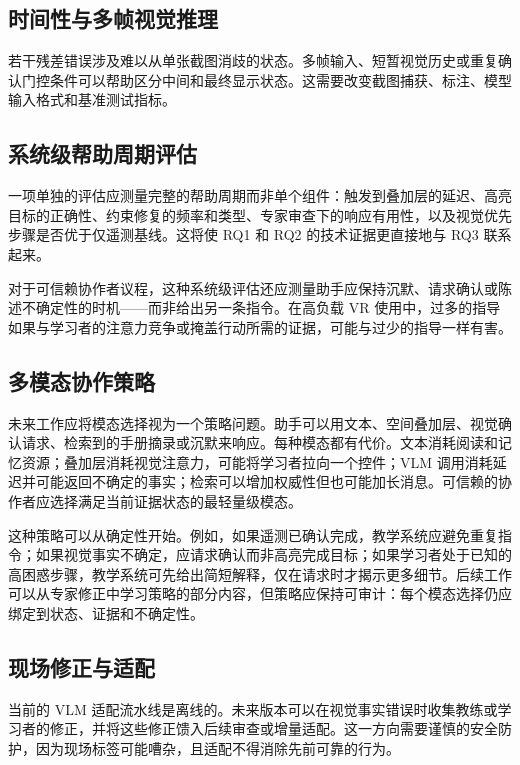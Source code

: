 \subsection{时间性与多帧视觉推理}

若干残差错误涉及难以从单张截图消歧的状态。多帧输入、短暂视觉历史或重复确认门控条件可以帮助区分中间和最终显示状态。这需要改变截图捕获、标注、模型输入格式和基准测试指标。

\subsection{系统级帮助周期评估}

一项单独的评估应测量完整的帮助周期而非单个组件：触发到叠加层的延迟、高亮目标的正确性、约束修复的频率和类型、专家审查下的响应有用性，以及视觉优先步骤是否优于仅遥测基线。这将使 RQ1 和 RQ2 的技术证据更直接地与 RQ3 联系起来。

对于可信赖协作者议程，这种系统级评估还应测量助手应保持沉默、请求确认或陈述不确定性的时机——而非给出另一条指令。在高负载 VR 使用中，过多的指导如果与学习者的注意力竞争或掩盖行动所需的证据，可能与过少的指导一样有害。

\subsection{多模态协作策略}

未来工作应将模态选择视为一个策略问题。助手可以用文本、空间叠加层、视觉确认请求、检索到的手册摘录或沉默来响应。每种模态都有代价。文本消耗阅读和记忆资源；叠加层消耗视觉注意力，可能将学习者拉向一个控件；VLM 调用消耗延迟并可能返回不确定的事实；检索可以增加权威性但也可能加长消息。可信赖的协作者应选择满足当前证据状态的最轻量级模态。

这种策略可以从确定性开始。例如，如果遥测已确认完成，教学系统应避免重复指令；如果视觉事实不确定，应请求确认而非高亮完成目标；如果学习者处于已知的高困惑步骤，教学系统可先给出简短解释，仅在请求时才揭示更多细节。后续工作可以从专家修正中学习策略的部分内容，但策略应保持可审计：每个模态选择仍应绑定到状态、证据和不确定性。

\subsection{现场修正与适配}

当前的 VLM 适配流水线是离线的。未来版本可以在视觉事实错误时收集教练或学习者的修正，并将这些修正馈入后续审查或增量适配。这一方向需要谨慎的安全防护，因为现场标签可能嘈杂，且适配不得消除先前可靠的行为。


